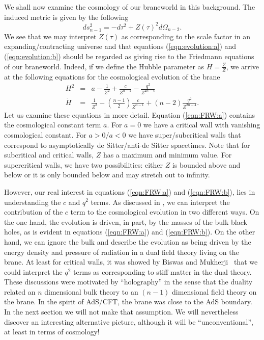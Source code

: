 \documentclass[a4paper,12pt]{article}
\begin{document}
We shall now examine the cosmology of our braneworld in this
background. The induced metric is given by the following
\begin{equation}
ds_{n-1}^2 = -d\tau^2 + Z(\tau)^2 d\Omega_{n-2}.
\end{equation}
We see that we may interpret $Z(\tau)$ as corresponding to the scale
factor in an  expanding/contracting universe and that equations
(\ref{eqn:evolution:a}) and (\ref{eqn:evolution:b}) should be regarded
as giving rise to the Friedmann equations of our braneworld. Indeed,
if we define the Hubble parameter as $H=\frac{\dot{Z}}{Z}$, we arrive
at the following equations for the cosmological evolution of the brane
\begin{subequations}  \label{eqn:FRW}
\begin{eqnarray}
H^2 & = & a - \frac{1}{Z^2} + \frac{c}{Z^{n-1}} - \frac{q^2}{Z^{2n-4}}
\label{eqn:FRW:a} \\
\dot{H} & = & \frac{1}{Z^2} -
\left(\frac{n-1}{2}\right)\frac{c}{Z^{n-1}}
+(n-2)\frac{q^2}{Z^{2n-4}}. \label{eqn:FRW:b}
\end{eqnarray}
\end{subequations}
Let us examine these equations in more detail. Equation
(\ref{eqn:FRW:a}) contains the cosmological constant term $a$. For
$a=0$ we have a critical wall with vanishing cosmological
constant. For $a > 0 /a<0$ we have super/subcritical walls that
correspond to asymptotically de Sitter/anti-de Sitter spacetimes. Note
that for subcritical and critical walls, $Z$ has a maximum and minimum
value. For supercritical walls, we have two possibilities: either $Z$
is bounded above and below or it is only bounded below and may stretch
out to infinity.

However, our real interest in equations (\ref{eqn:FRW:a}) and
(\ref{eqn:FRW:b}), lies in understanding the $c$ and $q^2$ terms. As
discussed in \cite{Savonije:braneCFT, Padilla:CFT}, we can interpret
the contribution of the $c$ term to the cosmological evolution in two
different ways. On the one hand, the evolution  is driven, in part, by
the masses of the bulk black holes, as is evident in equations
(\ref{eqn:FRW:a}) and (\ref{eqn:FRW:b}).  On the other hand, we can
ignore the bulk and describe the evolution as  being driven by the
energy density and pressure of radiation in a dual field theory living
on the brane. At least for critical walls, it was showed by Biswas and
Mukherji~\cite{Biswas:stiffmatter} that we could interpret the $q^2$
terms as corresponding to stiff matter in the dual theory. These
discussions were motivated by ``holography'' in the sense that the
duality related an $n$ dimensional bulk theory to an $(n-1)$
dimensional field theory on the brane. In the spirit of AdS/CFT, the
brane was close to the AdS boundary. In the next section we will not
make that assumption. We will nevertheless discover an interesting
alternative picture, although it will be ``unconventional'', at least
in terms of cosmology!
\end{document}
